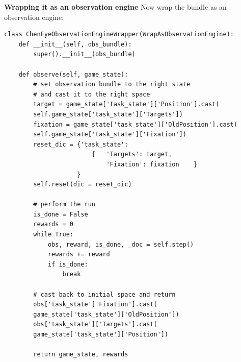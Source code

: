 \documentclass[11pt, xcolor = {dvipsnames}]{beamer}
\begin{document}
\begin{frame}[fragile]{\textbf{Wrapping it as an observation engine}}
Now wrap the bundle as an observation engine:
\begin{adjustbox}{width=.6\textwidth}
\lstset{language=Python}
\lstset{frame=lines}
\lstset{basicstyle=\footnotesize}
\begin{lstlisting}
class ChenEyeObservationEngineWrapper(WrapAsObservationEngine):
    def __init__(self, obs_bundle):
        super().__init__(obs_bundle)

    def observe(self, game_state):
        # set observation bundle to the right state 
        # and cast it to the right space
        target = game_state['task_state']['Position'].cast(
        self.game_state['task_state']['Targets'])
        fixation = game_state['task_state']['OldPosition'].cast(
        self.game_state['task_state']['Fixation'])
        reset_dic = {'task_state':
                        {   'Targets': target,
                            'Fixation': fixation    }
                    }
        self.reset(dic = reset_dic)

        # perform the run
        is_done = False
        rewards = 0
        while True:
            obs, reward, is_done, _doc = self.step()
            rewards += reward
            if is_done:
                break
                
		# cast back to initial space and return
        obs['task_state'['Fixation'].cast(
        game_state['task_state']['OldPosition'])
        obs['task_state']['Targets'].cast(
        game_state['task_state']['Position'])

        return game_state, rewards

\end{lstlisting}
\end{adjustbox}
\end{frame}
\end{document}
